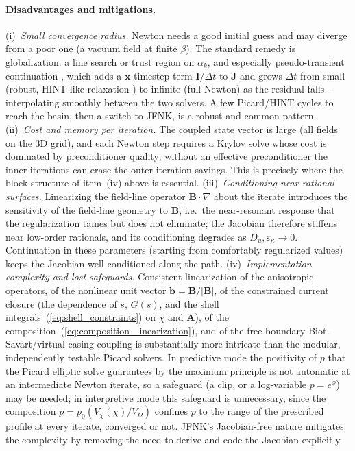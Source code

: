 \documentclass[english]{article}
\newcommand{\bB}{\mathbf{B}}
\newcommand{\bb}{\mathbf{b}}
\begin{document}
\paragraph{Disadvantages and mitigations.}
(i)~\emph{Small convergence radius.} Newton needs a good initial guess and may diverge from a poor
one (a vacuum field at finite $\beta$). The standard remedy is globalization: a line search or trust
region on $\alpha_k$, and especially pseudo-transient continuation \cite{kelley1998}, which adds a
$\mathbf{x}$-timestep term $\mathbf{I}/\Delta t$ to $\mathbf{J}$ and grows $\Delta t$ from small
(robust, HINT-like relaxation \cite{harafuji1989,suzuki2006}) to infinite (full Newton) as the
residual falls---interpolating smoothly between the two solvers. A few Picard/HINT cycles to reach
the basin, then a switch to JFNK, is a robust and common pattern. (ii)~\emph{Cost and memory per
iteration.} The coupled state vector is large (all fields on the 3D grid), and each Newton step
requires a Krylov solve whose cost is dominated by preconditioner quality; without an effective
preconditioner the inner iterations can erase the outer-iteration savings. This is precisely where
the block structure of item~(iv) above is essential. (iii)~\emph{Conditioning near rational
surfaces.} Linearizing the field-line operator $\bB\cdot\nabla$ about the iterate introduces the
sensitivity of the field-line geometry to $\bB$, i.e.\ the near-resonant response that the
regularization tames but does not eliminate; the Jacobian therefore stiffens near low-order
rationals, and its conditioning degrades as $D_u,\varepsilon_\kappa\to0$. Continuation in these
parameters (starting from comfortably regularized values) keeps the Jacobian well conditioned along
the path. (iv)~\emph{Implementation complexity and lost safeguards.} Consistent linearization of the
anisotropic operators, of the nonlinear unit vector $\bb=\bB/|\bB|$, of the constrained current
closure (the dependence of $s$, $G(s)$, and the shell integrals~(\ref{eq:shell_constraints}) on
$\chi$ and $\mathbf A$), of the composition~(\ref{eq:composition_linearization}), and of
the free-boundary Biot--Savart/virtual-casing coupling \cite{hanson2015} is substantially more
intricate than the modular, independently testable Picard solvers. In predictive mode the
positivity of $p$ that the Picard elliptic solve guarantees by the maximum principle is not
automatic at an intermediate Newton iterate, so a safeguard (a clip, or a log-variable
$p=e^{\phi}$) may be needed; in interpretive mode this safeguard is unnecessary, since the
composition $p=p_0(V_\chi(\chi)/V_\Omega)$ confines $p$ to the range of the prescribed profile at every
iterate, converged or not. JFNK's Jacobian-free nature mitigates the complexity by removing
the need to derive and code the Jacobian explicitly.
\end{document}
